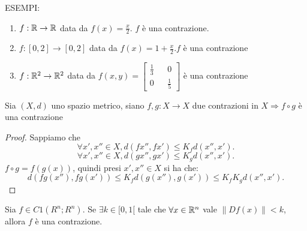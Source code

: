 ESEMPI:\\
\begin{enumerate}
	\item $f: \mathbb{R} \rightarrow \mathbb{R}$ data da $f(x) = \frac{x}{2}$. $f$ è una contrazione.
	\item $f: [0,2] \rightarrow [0,2]$ data da $f(x) = 1+\frac{x}{2}. f$ è una contrazione
	\item $f: \mathbb{R}^2 \rightarrow \mathbb{R}^2$ data da $f(x,y)=\begin{bmatrix} \frac{1}{3}&&0\\0&&\frac{1}{5}\end{bmatrix}$ è una contrazione
\end{enumerate}

\proposition
Sia $(X, d)$ uno spazio metrico, siano $f,g:X\rightarrow X$ due contrazioni in $X \Rightarrow f\circ g$ è una contrazione
\begin{proof}
	Sappiamo che\\
	$$\forall x',x''\in X, d(fx'', fx')\le K_fd(x'', x').$$
	$$\forall x',x''\in X, d(gx'', gx')\le K_gd(x'', x').$$
	$f\circ g=f(g(x))$, quindi presi $x',x''\in X$ si ha che: $$d(fg(x''), fg(x'))\le K_fd(g(x''), g(x'))\le K_fK_gd(x'',x').$$
\end{proof}

\proposition
Sia $f \in C1(R^n;R^n)$. Se $\exists k \in [0, 1[$ tale che $\forall x \in \mathbb{R}^n$ vale $\left\| Df(x)\right\|  < k$, allora $f$ è una contrazione.

